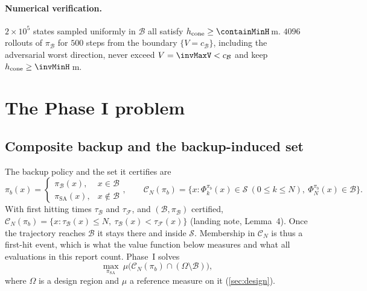 \documentclass[11pt,a4paper]{article}
\newcommand{\B}{\mathcal{B}}
\newcommand{\Sset}{\mathcal{S}}
\newcommand{\Fset}{\mathcal{F}}
\newcommand{\hc}{h_{\mathrm{cone}}}
\begin{document}
\paragraph{Numerical verification.} $2\times10^5$ states sampled uniformly in $\B$ all satisfy
$\hc\ge\containMinH$\,m. $4096$ rollouts of $\pi_{\B}$ for $500$ steps from the boundary $\{V=c_{\B}\}$, including
the adversarial worst direction, never exceed $V=\invMaxV<c_{\B}$ and keep $\hc\ge\invMinH$\,m.

\section{The Phase I problem}

\subsection{Composite backup and the backup-induced set}
The backup policy and the set it certifies are
\begin{equation}
\pi_b(x)=\begin{cases}\pi_{\B}(x),&x\in\B\\ \pi_{\mathrm{SA}}(x),&x\notin\B\end{cases},\qquad
\mathcal{C}_N(\pi_b)=\{x:\Phi^{\pi_b}_k(x)\in\Sset\ (0\le k\le N),\ \Phi^{\pi_b}_N(x)\in\B\}.
\label{eq:CN}
\end{equation}
With first hitting times $\tau_{\B}$ and $\tau_{\Fset}$, and $(\B,\pi_{\B})$ certified,
$\mathcal{C}_N(\pi_b)=\{x:\tau_{\B}(x)\le N,\ \tau_{\B}(x)<\tau_{\Fset}(x)\}$ (landing note, Lemma~4). Once
the trajectory reaches $\B$ it stays there and inside $\Sset$. Membership in $\mathcal{C}_N$ is thus a
first-hit event, which is what the value function below measures and what all evaluations in this report
count. Phase~I solves
\begin{equation}
\max_{\pi_{\mathrm{SA}}}\ \mu\big(\mathcal{C}_N(\pi_b)\cap(\Omega\setminus\B)\big),
\label{eq:sp2}
\end{equation}
where $\Omega$ is a design region and $\mu$ a reference measure on it (\cref{sec:design}).
\end{document}

